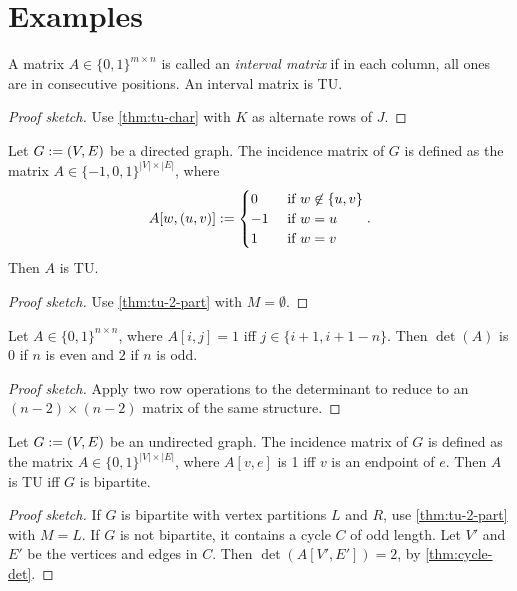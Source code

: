 \documentclass[a4paper,12pt,fleqn]{article}
\begin{document}
\section{Examples}

\begin{lemma}
A matrix $A \in \{0, 1\}^{m \times n}$ is called an \emph{interval matrix}
if in each column, all ones are in consecutive positions.
An interval matrix is TU.
\end{lemma}
\begin{proof}[Proof sketch]
Use \cref{thm:tu-char} with $K$ as alternate rows of $J$.
\end{proof}

\begin{lemma}
Let $G := (V, E)$ be a directed graph.
The incidence matrix of $G$ is defined as the matrix $A \in \{-1, 0, 1\}^{|V| \times |E|}$, where
\[ A[w, (u, v)] := \begin{cases}0 & \textrm{ if } w \not\in \{u, v\}
\\ -1 & \textrm{ if } w = u
\\ 1 & \textrm{ if } w = v
\end{cases}. \]
Then $A$ is TU.
\end{lemma}
\begin{proof}[Proof sketch]
Use \cref{thm:tu-2-part} with $M = \emptyset$.
\end{proof}

\begin{lemma}
\label{thm:cycle-det}
Let $A \in \{0, 1\}^{n \times n}$, where $A[i, j] = 1$ iff $j \in \{i+1, i+1-n\}$.
Then $\det(A)$ is 0 if $n$ is even and $2$ if $n$ is odd.
\end{lemma}
\begin{proof}[Proof sketch]
Apply two row operations to the determinant to reduce to
an $(n-2) \times (n-2)$ matrix of the same structure.
\end{proof}

\begin{lemma}
Let $G := (V, E)$ be an undirected graph.
The incidence matrix of $G$ is defined as the matrix $A \in \{0, 1\}^{|V| \times |E|}$,
where $A[v, e]$ is 1 iff $v$ is an endpoint of $e$.
Then $A$ is TU iff $G$ is bipartite.
\end{lemma}
\begin{proof}[Proof sketch]
If $G$ is bipartite with vertex partitions $L$ and $R$,
use \cref{thm:tu-2-part} with $M = L$.
If $G$ is not bipartite, it contains a cycle $C$ of odd length.
Let $V'$ and $E'$ be the vertices and edges in $C$.
Then $\det(A[V', E']) = 2$, by \cref{thm:cycle-det}.
\end{proof}
\end{document}
